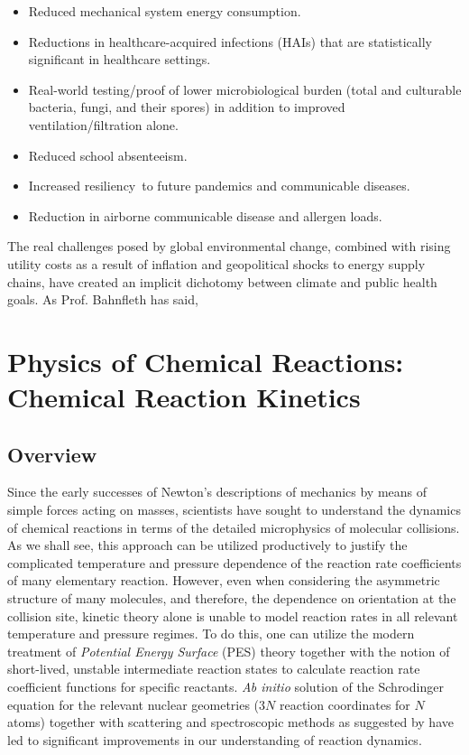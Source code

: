 \begin{itemize}
\item Reduced mechanical system energy consumption.
\item Reductions in healthcare-acquired infections (HAIs) that are statistically significant in healthcare settings.
\item Real-world testing/proof of lower microbiological burden (total and culturable bacteria, fungi, and their spores) in addition to improved ventilation/filtration alone.
\item Reduced school absenteeism.
\item Increased resiliency to future pandemics and communicable diseases.
\item Reduction in airborne communicable disease and allergen loads.
\end{itemize}


The real challenges posed by global environmental change, combined with rising utility costs as a result of inflation and geopolitical shocks to energy supply chains, have created an implicit dichotomy between climate and public health goals. As Prof. Bahnfleth has said,



\section{Physics of Chemical Reactions: Chemical Reaction Kinetics}

\subsection{Overview}

Since the early successes of Newton's descriptions of mechanics by means of simple forces acting on masses, scientists have sought to understand the dynamics of chemical reactions in terms of the detailed microphysics of molecular collisions. As we shall see, this approach can be utilized productively to justify the complicated temperature and pressure dependence of the reaction rate coefficients of many elementary reaction. However, even when considering the asymmetric structure of many molecules, and therefore, the dependence on orientation at the collision site, kinetic theory alone is unable to model reaction rates in all relevant temperature and pressure regimes. To do this, one can utilize the modern treatment of \textit{Potential Energy Surface} (PES) theory together with the notion of short-lived, unstable intermediate reaction states to calculate reaction rate coefficient functions for specific reactants. \textit{Ab initio} solution of the Schrodinger equation for the relevant nuclear geometries ($3N$ reaction coordinates for $N$ atoms) together with scattering and spectroscopic methods as suggested by \cite{transition-state-spectroscopy-bimol} have led to significant improvements in our understanding of reaction dynamics.


